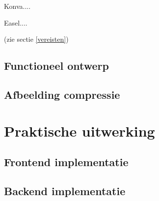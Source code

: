Konva....

Easel....



(zie sectie \ref{vereisten})

\newpage
\section{Functioneel ontwerp}

\newpage
\section{Afbeelding compressie}

\chapter{Praktische uitwerking}
\vspace{-3cm}
\section{Frontend implementatie}
\section{Backend implementatie}


%
%
